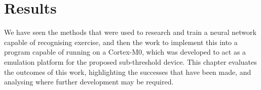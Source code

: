 \chapter{Results}\label{chap:results}

We have seen the methods that were used to research and train a neural network capable of recognising exercise, and then the work to implement this into a program capable of running on a Cortex-M0, which was developed to act as a emulation platform for the proposed sub-threshold device. This chapter evaluates the outcomes of this work, highlighting the successes that have been made, and analysing where further development may be required.




